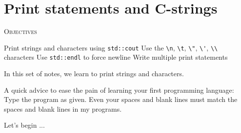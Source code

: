 \chapter{Print statements and C-strings}


\textsc{Objectives}
\begin{tightlist}
\li Print strings and characters using \verb!std::cout!
\li Use the \verb!\n!, \verb!\t!, \verb!\"!, \verb!\'!, 
    \verb!\\! characters
\li Use \verb!std::endl! to force newline
\li Write multiple print statements
\end{tightlist}

In this set of notes, we learn to print strings and characters.

A quick advice to ease the pain of learning your first programming language: 
Type the program 
 as given. 
Even your spaces and blank lines must match the spaces 
and blank lines in my programs.

Let's begin ...

